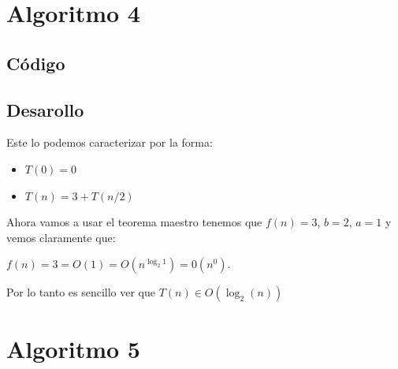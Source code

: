 \documentclass[12pt, fleqn]{article}                            %
\theoremstyle{break}                                            %
\begin{document}
\clearpage
\section{Algoritmo 4}



    \subsection{Código}

        


    \vspace{1em}
    \subsection{Desarollo}

        Este lo podemos caracterizar por la forma:
        \begin{itemize}
            \item $T(0) = 0$
            \item $T(n) = 3 + T(n / 2)$
        \end{itemize}

        Ahora vamos a usar el teorema maestro tenemos que $f(n) = 3$, $b = 2$, $a = 1$
        y vemos claramente que: 

        $f(n) = 3 = O(1) = O(n ^{\log_2 1}) = 0(n^0)$.

        Por lo tanto es sencillo ver que $T(n) \in O(\log_2(n))$



\clearpage
\section{Algoritmo 5}
\end{document}
